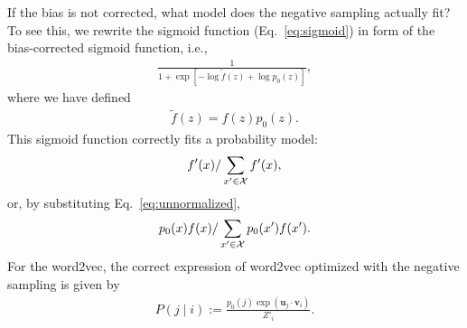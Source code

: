 \documentclass[12pt]{article} %
\def\given{\mid}
\def\ie{i.e.,~}
\begin{document}
If the bias is not corrected, what model does the negative sampling actually fit?
To see this, we rewrite the sigmoid function (Eq.~\eqref{eq:sigmoid}) in form of the bias-corrected sigmoid function, \ie
\begin{align}
    \label{eq:sigmoid3}
    \frac{1}{1 + \exp\left[ - \log \tilde f(z) + \log p_0(z)  \right]},
\end{align}
where we have defined
\begin{align}
    \label{eq:unnormalized}
    \tilde f(z) = f(z) p_0(z).
\end{align}
This sigmoid function correctly fits a probability model:
\begin{align}
    f'(x) / \sum_{x' \in {\cal X}} f'(x),
\end{align}
or, by substituting Eq.~\eqref{eq:unnormalized},
\begin{align}
    p_0(x)f(x) / \sum_{x' \in {\cal X}} p_0(x')f(x').
\end{align}
For the word2vec, the correct expression of word2vec optimized with the negative sampling is given by
\begin{align}
    P\left(j \given i \right):= \frac{p_0(j)\exp(\bm{u}_j \cdot \bm{v}_{i})}{Z'_i}.
\end{align}



\end{document}

